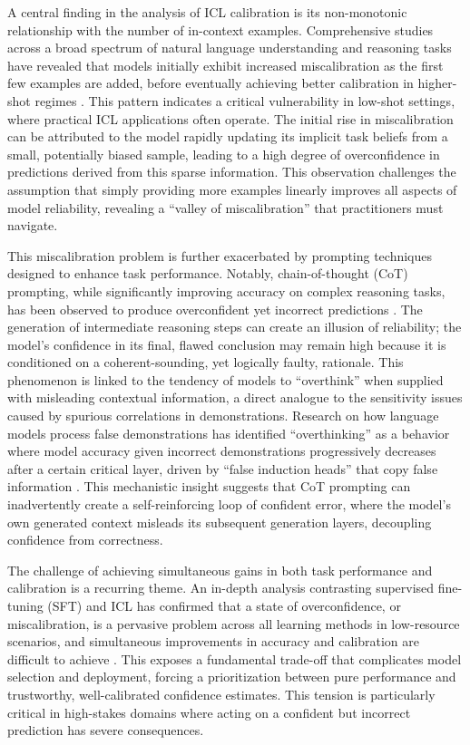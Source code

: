\documentclass[11pt]{article}
\begin{document}
A central finding in the analysis of ICL calibration is its non-monotonic relationship with the number of in-context examples. Comprehensive studies across a broad spectrum of natural language understanding and reasoning tasks have revealed that models initially exhibit increased miscalibration as the first few examples are added, before eventually achieving better calibration in higher-shot regimes \cite{ref38}. This pattern indicates a critical vulnerability in low-shot settings, where practical ICL applications often operate. The initial rise in miscalibration can be attributed to the model rapidly updating its implicit task beliefs from a small, potentially biased sample, leading to a high degree of overconfidence in predictions derived from this sparse information. This observation challenges the assumption that simply providing more examples linearly improves all aspects of model reliability, revealing a ``valley of miscalibration'' that practitioners must navigate.

This miscalibration problem is further exacerbated by prompting techniques designed to enhance task performance. Notably, chain-of-thought (CoT) prompting, while significantly improving accuracy on complex reasoning tasks, has been observed to produce overconfident yet incorrect predictions \cite{ref38}. The generation of intermediate reasoning steps can create an illusion of reliability; the model's confidence in its final, flawed conclusion may remain high because it is conditioned on a coherent-sounding, yet logically faulty, rationale. This phenomenon is linked to the tendency of models to ``overthink'' when supplied with misleading contextual information, a direct analogue to the sensitivity issues caused by spurious correlations in demonstrations. Research on how language models process false demonstrations has identified ``overthinking'' as a behavior where model accuracy given incorrect demonstrations progressively decreases after a certain critical layer, driven by ``false induction heads'' that copy false information \cite{ref419}. This mechanistic insight suggests that CoT prompting can inadvertently create a self-reinforcing loop of confident error, where the model's own generated context misleads its subsequent generation layers, decoupling confidence from correctness.

The challenge of achieving simultaneous gains in both task performance and calibration is a recurring theme. An in-depth analysis contrasting supervised fine-tuning (SFT) and ICL has confirmed that a state of overconfidence, or miscalibration, is a pervasive problem across all learning methods in low-resource scenarios, and simultaneous improvements in accuracy and calibration are difficult to achieve \cite{ref39}. This exposes a fundamental trade-off that complicates model selection and deployment, forcing a prioritization between pure performance and trustworthy, well-calibrated confidence estimates. This tension is particularly critical in high-stakes domains where acting on a confident but incorrect prediction has severe consequences.
\end{document}
